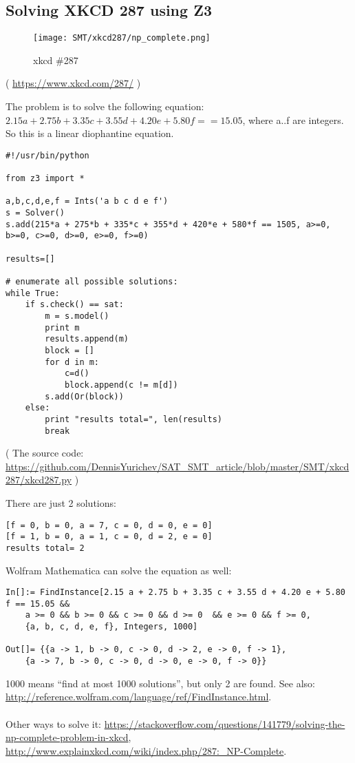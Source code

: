 \subsection{Solving XKCD 287 using Z3}
\label{XkcdILP}

\begin{figure}[H]
\centering
\texttt{[image: SMT/xkcd287/np\_complete.png]}
\caption{xkcd \#287}
\end{figure}

( \url{https://www.xkcd.com/287/} )

The problem is to solve the following equation:
$2.15a + 2.75b + 3.35c + 3.55d + 4.20e + 5.80f == 15.05$,
where a..f are integers.
So this is a linear diophantine equation.

\begin{lstlisting}
#!/usr/bin/python

from z3 import *

a,b,c,d,e,f = Ints('a b c d e f')
s = Solver()
s.add(215*a + 275*b + 335*c + 355*d + 420*e + 580*f == 1505, a>=0, b>=0, c>=0, d>=0, e>=0, f>=0)

results=[]

# enumerate all possible solutions:
while True:
    if s.check() == sat:
        m = s.model()
        print m
        results.append(m)
        block = []
        for d in m:
            c=d()
            block.append(c != m[d])
        s.add(Or(block))
    else:
        print "results total=", len(results)
        break
\end{lstlisting}

( The source code: \url{https://github.com/DennisYurichev/SAT_SMT_article/blob/master/SMT/xkcd287/xkcd287.py} )

There are just 2 solutions:

\begin{lstlisting}
[f = 0, b = 0, a = 7, c = 0, d = 0, e = 0]
[f = 1, b = 0, a = 1, c = 0, d = 2, e = 0]
results total= 2
\end{lstlisting}

Wolfram Mathematica can solve the equation as well:

\begin{lstlisting}
In[]:= FindInstance[2.15 a + 2.75 b + 3.35 c + 3.55 d + 4.20 e + 5.80 f == 15.05 && 
	a >= 0 && b >= 0 && c >= 0 && d >= 0  && e >= 0 && f >= 0, 
	{a, b, c, d, e, f}, Integers, 1000]

Out[]= {{a -> 1, b -> 0, c -> 0, d -> 2, e -> 0, f -> 1},
	{a -> 7, b -> 0, c -> 0, d -> 0, e -> 0, f -> 0}}
\end{lstlisting}

1000 means ``find at most 1000 solutions'', but only 2 are found.
See also: \url{http://reference.wolfram.com/language/ref/FindInstance.html}.\\
\\
Other ways to solve it:
\url{https://stackoverflow.com/questions/141779/solving-the-np-complete-problem-in-xkcd},
\url{http://www.explainxkcd.com/wiki/index.php/287:_NP-Complete}.

